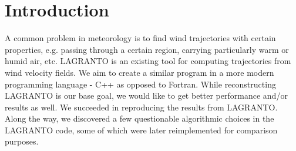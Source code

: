 \setcounter{chapter}{0}

\chapter{Introduction}

A common problem in meteorology is to find wind trajectories with certain properties, e.g. passing through a certain region, carrying particularly warm or humid air, etc.
LAGRANTO \cite{src:lagranto} is an existing tool for computing trajectories from wind velocity fields. We aim to create a similar program in a more modern programming language - C++ as opposed to Fortran. While reconstructing LAGRANTO is our base goal, we would like to get better performance and/or results as well.
We succeeded in reproducing the results from LAGRANTO. Along the way, we discovered a few questionable algorithmic choices in the LAGRANTO code, some of which were later reimplemented for comparison purposes.

